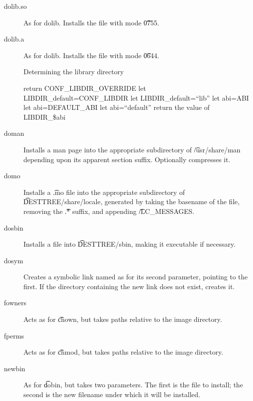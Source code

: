 \begin{description}
\item[dolib.so] As for dolib. Installs the file with mode \t{0755}.

\item[dolib.a] As for dolib. Installs the file with mode \t{0644}.

\begin{algorithm}
\caption{Determining the library directory} \label{ebuild-libdir}
\begin{algorithmic}[1]
    \STATE return CONF\_LIBDIR\_OVERRIDE
\ENDIF
{}
    \STATE let LIBDIR\_default=CONF\_LIBDIR
\ELSE
    \STATE let LIBDIR\_default=``lib''
\ENDIF
{}
    \STATE let abi=ABI
    \STATE let abi=DEFAULT\_ABI
\ELSE
    \STATE let abi=``default''
\ENDIF
\STATE return the value of LIBDIR\_\$abi
\end{algorithmic}
\end{algorithm}

\item[doman] Installs a man page into the appropriate subdirectory of \t{/usr/share/man} depending
    upon its apparent section suffix. Optionally compresses it.

\item[domo] Installs a \t{.mo} file into the appropriate subdirectory of \t{DESTTREE/share/locale},
    generated by taking the basename of the file, removing the \t{.*} suffix, and appending
    \t{/LC\_MESSAGES}.

\item[dosbin] Installs a file into \t{DESTTREE/sbin}, making it executable if necessary.

\item[dosym] Creates a symbolic link named as for its second parameter, pointing to the first. If
    the directory containing the new link does not exist, creates it.

\item[fowners] Acts as for \t{chown}, but takes paths relative to the image directory.

\item[fperms] Acts as for \t{chmod}, but takes paths relative to the image directory.

\item[newbin] As for \t{dobin}, but takes two parameters. The first is the file to install; the
    second is the new filename under which it will be installed.


\end{description}

